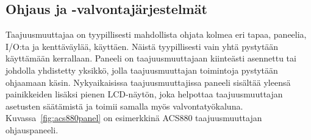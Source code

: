 \documentclass[finnish,12pt,a4paper,pdftex,elec,utf8]{aaltothesis}
\begin{document}
	



\subsection{Ohjaus ja -valvontajärjestelmät}
Taajuusmuuttajaa on tyypillisesti mahdollista ohjata kolmea eri tapaa, paneelia, I/O:ta ja kenttäväylää, käyttäen. Näistä tyypillisesti vain yhtä pystytään käyttämään kerrallaan. Paneeli on taajuusmuuttajaan kiinteästi asennettu tai johdolla yhdistetty yksikkö, jolla taajuusmuuttajan toimintoja pystytään ohjaamaan käsin. Nykyaikaisissa taajuusmuuttajissa paneeli sisältää yleensä painikkeiden lisäksi pienen LCD-näytön, joka helpottaa taajuusmuuttajan asetusten säätämistä ja toimii samalla myös valvontatyökaluna. Kuvassa~\ref{fig:acs880panel} on esimerkkinä ACS880 taajuusmuuttajan ohjauspaneeli. 
\end{document}
